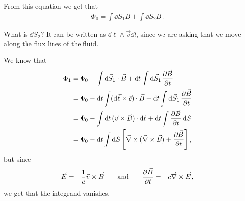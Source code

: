 \documentclass[main.tex]{subfiles}
\begin{document}
From this equation we get that 
%
\begin{align}
\Phi_0 = \int \dd{S_1} B + \int \dd{S_2} B
\,.
\end{align}

What is \(\dd{S_2}\)? It can be written as \(\dd{\ell} \wedge \vec{v} \dd{t}\), since we are asking that we move along the flux lines of the fluid. 

We know that 
%
\begin{align}
\Phi_1 
&= \Phi_0 - \int \dd{\vec{S}_1} \cdot \vec{B} 
 + \dd{t} \int \dd{\vec{S}_1} \pdv{\vec{B}}{t} (\vec{x} + \vec{v} \dd{t} , t_0 )  \\
&= \Phi_0 - \dd{t} \int (\dd{\vec{\ell}} \times \vec{c}) \cdot \vec{B} 
 + \dd{t} \int \dd{\vec{S}_1} \pdv{\vec{B}}{t} (\vec{x} + \vec{v} \dd{t} , t_0 )  \\
&= \Phi_0 - \int \dd{t} (\vec{v} \times \vec{B}) \cdot \dd{\ell} + \dd{t} \int \pdv{\vec{B}}{t} \dd{S}  \\
&= \Phi_0 - \dd{t} \int \dd{S} \qty[ \vec{\nabla} \times (\vec{\nabla} \times \vec{B}) + \pdv{\vec{B}}{t}]
\,,
\end{align}
%
but since 
%
\begin{align}
\vec{E} = - \frac{1}{c} \vec{v} \times \vec{B}
\qquad \text{and} \qquad
\pdv{\vec{B}}{t} = - c \vec{\nabla} \times \vec{E}
\,,
\end{align}
%
we get that the integrand vanishes. 
\end{document}
